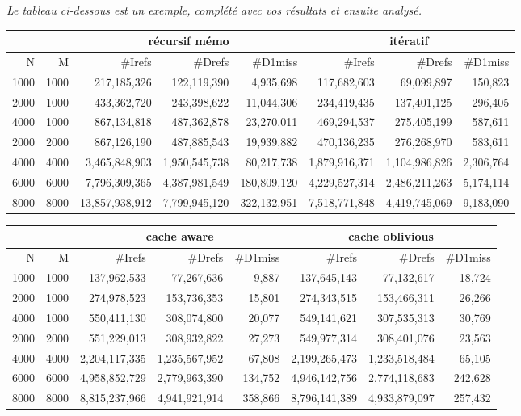 \documentclass[10pt,a4paper]{article}
\begin{document}
{\em Le tableau ci-dessous est un exemple,  complété avec vos résultats et 
ensuite analysé.}
\\
{\footnotesize
\begin{tabular}{|r|r||r|r|r||r|r|r||}
\hline
 \multicolumn{2}{|c||}{ } & \multicolumn{3}{c||}{récursif mémo} & \multicolumn{3}{c||}{itératif} \\
\hline
N & M & \#Irefs & \#Drefs & \#D1miss & \#Irefs & \#Drefs & \#D1miss \\
\hline
1000 & 1000 & 217,185,326 & 122,119,390 & 4,935,698 & 117,682,603 & 69,099,897 & 150,823 \\
2000 & 1000 & 433,362,720 & 243,398,622 & 11,044,306 & 234,419,435 & 137,401,125 & 296,405 \\
4000 & 1000 & 867,134,818 & 487,362,878 & 23,270,011 & 469,294,537 & 275,405,199 & 587,611 \\
2000 & 2000 & 867,126,190 & 487,885,543 & 19,939,882 & 470,136,235 & 276,268,970 & 583,611 \\
4000 & 4000 & 3,465,848,903 & 1,950,545,738 & 80,217,738 & 1,879,916,371 & 1,104,986,826 & 2,306,764 \\
6000 & 6000 & 7,796,309,365 & 4,387,981,549 & 180,809,120 & 4,229,527,314 & 2,486,211,263 & 5,174,114 \\
8000 & 8000 & 13,857,938,912 & 7,799,945,120 & 322,132,951 & 7,518,771,848 & 4,419,745,069 & 9,183,090 \\
\hline
\end{tabular}

\vspace{2mm} %

\begin{tabular}{|r|r||r|r|r||r|r|r||}
\hline
 \multicolumn{2}{|c||}{ } & \multicolumn{3}{c||}{cache aware} & \multicolumn{3}{c||}{cache oblivious} \\
\hline
N & M & \#Irefs & \#Drefs & \#D1miss & \#Irefs & \#Drefs & \#D1miss \\
\hline
1000 & 1000 & 137,962,533 & 77,267,636 & 9,887 & 137,645,143 & 77,132,617 & 18,724 \\
2000 & 1000 & 274,978,523 & 153,736,353 & 15,801 & 274,343,515 & 153,466,311 & 26,266 \\
4000 & 1000 & 550,411,130 & 308,074,800 & 20,077 & 549,141,621 & 307,535,313 & 30,769 \\
2000 & 2000 & 551,229,013 & 308,932,822 & 27,273 & 549,977,314 & 308,401,076 & 23,563 \\
4000 & 4000 & 2,204,117,335 & 1,235,567,952 & 67,808 & 2,199,265,473 & 1,233,518,484 & 65,105 \\
6000 & 6000 & 4,958,852,729 & 2,779,963,390 & 134,752 & 4,946,142,756 & 2,774,118,683 & 242,628 \\
8000 & 8000 & 8,815,237,966 & 4,941,921,914 & 358,866 & 8,796,141,389 &  4,933,879,097 & 257,432 \\
\hline
\end{tabular}
}
\end{document}
